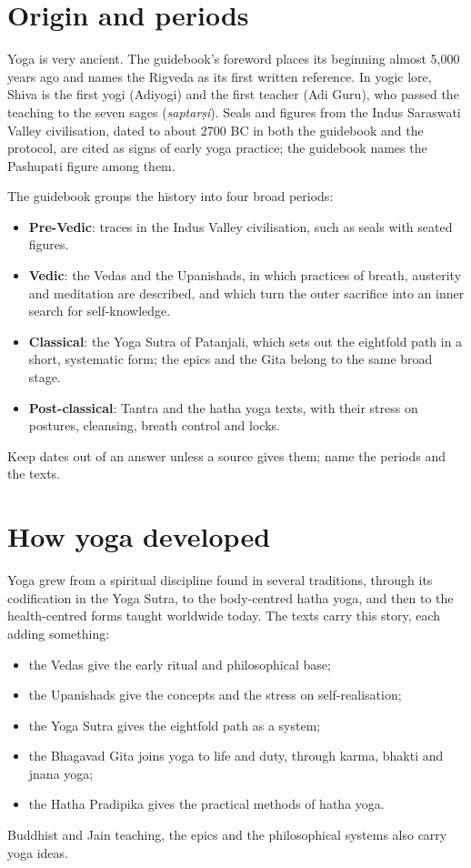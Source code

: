\section{Origin and periods}

Yoga is very ancient. The guidebook's foreword places its beginning almost 5,000 years ago and names the Rigveda as its first written reference. In yogic lore, Shiva is the first yogi (Adiyogi) and the first teacher (Adi Guru), who passed the teaching to the seven sages (\emph{saptarṣi}). Seals and figures from the Indus Saraswati Valley civilisation, dated to about 2700 BC in both the guidebook and the protocol, are cited as signs of early yoga practice; the guidebook names the Pashupati figure among them.

The guidebook groups the history into four broad periods:
\begin{itemize}
\item \textbf{Pre-Vedic}: traces in the Indus Valley civilisation, such as seals with seated figures.
\item \textbf{Vedic}: the Vedas and the Upanishads, in which practices of breath, austerity and meditation are described, and which turn the outer sacrifice into an inner search for self-knowledge.
\item \textbf{Classical}: the Yoga Sutra of Patanjali, which sets out the eightfold path in a short, systematic form; the epics and the Gita belong to the same broad stage.
\item \textbf{Post-classical}: Tantra and the hatha yoga texts, with their stress on postures, cleansing, breath control and locks.
\end{itemize}
Keep dates out of an answer unless a source gives them; name the periods and the texts.


\section{How yoga developed}

Yoga grew from a spiritual discipline found in several traditions, through its codification in the Yoga Sutra, to the body-centred hatha yoga, and then to the health-centred forms taught worldwide today. The texts carry this story, each adding something:
\begin{itemize}
\item the Vedas give the early ritual and philosophical base;
\item the Upanishads give the concepts and the stress on self-realisation;
\item the Yoga Sutra gives the eightfold path as a system;
\item the Bhagavad Gita joins yoga to life and duty, through karma, bhakti and jnana yoga;
\item the Hatha Pradipika gives the practical methods of hatha yoga.
\end{itemize}
Buddhist and Jain teaching, the epics and the philosophical systems also carry yoga ideas.

